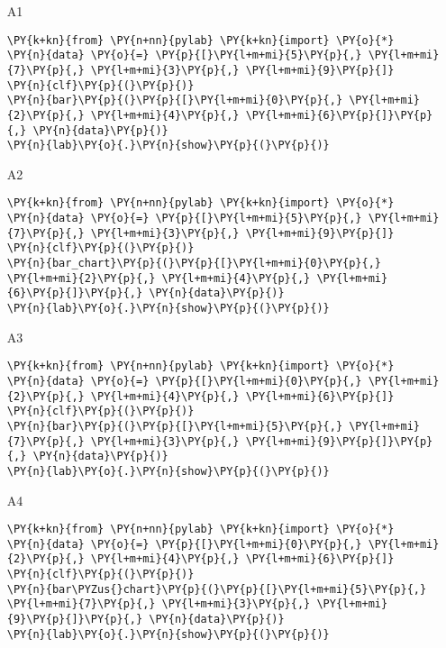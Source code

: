 \begin{enumerate}
\begin{enumerate}
\item[A1] 
\begin{Verbatim}[commandchars=\\\{\}]
\PY{k+kn}{from} \PY{n+nn}{pylab} \PY{k+kn}{import} \PY{o}{*}
\PY{n}{data} \PY{o}{=} \PY{p}{[}\PY{l+m+mi}{5}\PY{p}{,} \PY{l+m+mi}{7}\PY{p}{,} \PY{l+m+mi}{3}\PY{p}{,} \PY{l+m+mi}{9}\PY{p}{]}
\PY{n}{clf}\PY{p}{(}\PY{p}{)}
\PY{n}{bar}\PY{p}{(}\PY{p}{[}\PY{l+m+mi}{0}\PY{p}{,} \PY{l+m+mi}{2}\PY{p}{,} \PY{l+m+mi}{4}\PY{p}{,} \PY{l+m+mi}{6}\PY{p}{]}\PY{p}{,} \PY{n}{data}\PY{p}{)}
\PY{n}{lab}\PY{o}{.}\PY{n}{show}\PY{p}{(}\PY{p}{)}
\end{Verbatim}
\item[A2] 
\begin{Verbatim}[commandchars=\\\{\}]
\PY{k+kn}{from} \PY{n+nn}{pylab} \PY{k+kn}{import} \PY{o}{*}
\PY{n}{data} \PY{o}{=} \PY{p}{[}\PY{l+m+mi}{5}\PY{p}{,} \PY{l+m+mi}{7}\PY{p}{,} \PY{l+m+mi}{3}\PY{p}{,} \PY{l+m+mi}{9}\PY{p}{]}
\PY{n}{clf}\PY{p}{(}\PY{p}{)}
\PY{n}{bar_chart}\PY{p}{(}\PY{p}{[}\PY{l+m+mi}{0}\PY{p}{,} \PY{l+m+mi}{2}\PY{p}{,} \PY{l+m+mi}{4}\PY{p}{,} \PY{l+m+mi}{6}\PY{p}{]}\PY{p}{,} \PY{n}{data}\PY{p}{)}
\PY{n}{lab}\PY{o}{.}\PY{n}{show}\PY{p}{(}\PY{p}{)}
\end{Verbatim}
\item[A3]
\begin{Verbatim}[commandchars=\\\{\}]
\PY{k+kn}{from} \PY{n+nn}{pylab} \PY{k+kn}{import} \PY{o}{*}
\PY{n}{data} \PY{o}{=} \PY{p}{[}\PY{l+m+mi}{0}\PY{p}{,} \PY{l+m+mi}{2}\PY{p}{,} \PY{l+m+mi}{4}\PY{p}{,} \PY{l+m+mi}{6}\PY{p}{]}
\PY{n}{clf}\PY{p}{(}\PY{p}{)}
\PY{n}{bar}\PY{p}{(}\PY{p}{[}\PY{l+m+mi}{5}\PY{p}{,} \PY{l+m+mi}{7}\PY{p}{,} \PY{l+m+mi}{3}\PY{p}{,} \PY{l+m+mi}{9}\PY{p}{]}\PY{p}{,} \PY{n}{data}\PY{p}{)}
\PY{n}{lab}\PY{o}{.}\PY{n}{show}\PY{p}{(}\PY{p}{)}
\end{Verbatim}
\item[A4] 
\begin{Verbatim}[commandchars=\\\{\}]
\PY{k+kn}{from} \PY{n+nn}{pylab} \PY{k+kn}{import} \PY{o}{*}
\PY{n}{data} \PY{o}{=} \PY{p}{[}\PY{l+m+mi}{0}\PY{p}{,} \PY{l+m+mi}{2}\PY{p}{,} \PY{l+m+mi}{4}\PY{p}{,} \PY{l+m+mi}{6}\PY{p}{]}
\PY{n}{clf}\PY{p}{(}\PY{p}{)}
\PY{n}{bar\PYZus{}chart}\PY{p}{(}\PY{p}{[}\PY{l+m+mi}{5}\PY{p}{,} \PY{l+m+mi}{7}\PY{p}{,} \PY{l+m+mi}{3}\PY{p}{,} \PY{l+m+mi}{9}\PY{p}{]}\PY{p}{,} \PY{n}{data}\PY{p}{)}
\PY{n}{lab}\PY{o}{.}\PY{n}{show}\PY{p}{(}\PY{p}{)}
\end{Verbatim}
\end{enumerate}

\vspace{6mm}

\end{enumerate}

